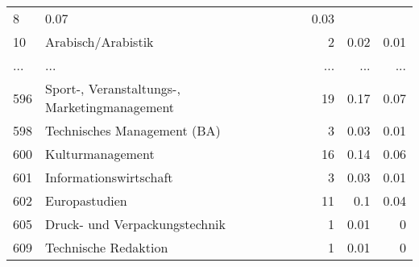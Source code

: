 \begin{longtable}{lXrrr}
          \num{8} &
          \num[round-mode=places,round-precision=2]{0.07} &
          \num[round-mode=places,round-precision=2]{0.03} \\
        10 & \multicolumn{1}{X}{Arabisch/Arabistik} & %
          \num{2} &
          \num[round-mode=places,round-precision=2]{0.02} &
          \num[round-mode=places,round-precision=2]{0.01} \\
       ... & ... & ... & ... & ... \\
        596 & \multicolumn{1}{X}{Sport-, Veranstaltungs-, Marketingmanagement} & %
          \num{19} &
          \num[round-mode=places,round-precision=2]{0.17} &
          \num[round-mode=places,round-precision=2]{0.07} \\

        598 & \multicolumn{1}{X}{Technisches Management (BA)} & %
          \num{3} &
          \num[round-mode=places,round-precision=2]{0.03} &
          \num[round-mode=places,round-precision=2]{0.01} \\

        600 & \multicolumn{1}{X}{Kulturmanagement} & %
          \num{16} &
          \num[round-mode=places,round-precision=2]{0.14} &
          \num[round-mode=places,round-precision=2]{0.06} \\

        601 & \multicolumn{1}{X}{Informationswirtschaft} & %
          \num{3} &
          \num[round-mode=places,round-precision=2]{0.03} &
          \num[round-mode=places,round-precision=2]{0.01} \\

        602 & \multicolumn{1}{X}{Europastudien} & %
          \num{11} &
          \num[round-mode=places,round-precision=2]{0.1} &
          \num[round-mode=places,round-precision=2]{0.04} \\

        605 & \multicolumn{1}{X}{Druck- und Verpackungstechnik} & %
          \num{1} &
          \num[round-mode=places,round-precision=2]{0.01} &
          \num[round-mode=places,round-precision=2]{0} \\

        609 & \multicolumn{1}{X}{Technische Redaktion} & %
          \num{1} &
          \num[round-mode=places,round-precision=2]{0.01} &
          \num[round-mode=places,round-precision=2]{0} \\


\end{longtable}
